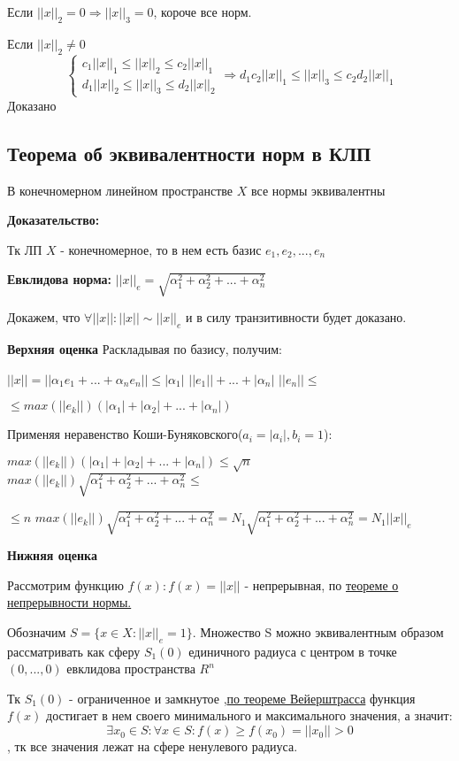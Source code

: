 \documentclass[12pt]{article}
\begin{document}
	Если $||x||_2 = 0 \Rightarrow ||x||_3 = 0$, короче все норм.
	
	Если $||x||_2 \neq 0 $
		$$
\begin{cases}
	c_1||x||_1 \leq ||x||_2 \leq c_2||x||_1 \\
	d_1||x||_2 \leq ||x||_3 \leq d_2||x||_2
\end{cases}
\Rightarrow
	d_1 c_2 ||x||_1 \leq ||x||_3  \leq c_2 d_2||x||_1
$$
		Доказано
		
\subsection{Теорема об эквивалентности норм в КЛП}
	В конечномерном линейном пространстве $X$ все нормы эквивалентны
	
\textbf{Доказательство:}
	
	Тк ЛП $X$ - конечномерное, то в нем есть базис $e_1 , e_2, ..., e_n$
		
	\textbf{Евклидова норма:} $||x||_e = \sqrt{\alpha_1^2 + \alpha_2^2 + ... +\alpha_n^2  }$
	
	Докажем, что $\forall ||x|| : ||x|| \sim ||x||_e$ и в силу транзитивности будет доказано.
	
\textbf{	Верхняя оценка}
	Раскладывая по базису, получим:
	
	$||x|| = || \alpha_1 e_1 + ... + \alpha_n e_n|| \leq |\alpha_1|$ $||e_1|| + ... + |\alpha_n|$ $||e_n|| \leq $
	
	$\leq max(||e_k||) (|\alpha_1| + |\alpha_2| + ...+ |\alpha_n|)$
	
	Применяя неравенство Коши-Буняковского($a_i = |a_i|, b_i = 1$):
			
	$max(||e_k||) (|\alpha_1| + |\alpha_2| + ...+ |\alpha_n|) \leq  \sqrt{n}$ $max(||e_k||)\sqrt{\alpha_1^2 + \alpha_2^2 + ... +\alpha_n^2  } \leq$
	
	$\leq n $ $max(||e_k||)\sqrt{\alpha_1^2 + \alpha_2^2 + ... +\alpha_n^2  } = N_1\sqrt{\alpha_1^2 + \alpha_2^2 + ... +\alpha_n^2  } = N_1 ||x||_e$

\textbf{Нижняя оценка}

		Рассмотрим функцию $f(x): f(x) = ||x||$ - непрерывная, по \hyperref[eq100]{теореме о непрерывности нормы.}
		
		 Обозначим $S = \{ x \in X : ||x||_e = 1 \}$. Множество S можно эквивалентным образом рассматривать как сферу $S_1(0)$ единичного радиуса с центром в
точке $(0,..., 0)$ евклидова пространства $R^n$

	Тк $S_1(0)$ - ограниченное и замкнутое ,\hyperref[eq202]{по теореме Вейерштрасса} функция $f(x)$ достигает в нем
	своего минимального и максимального значения, а значит:
	$$\exists x_0 \in S: \forall x \in S: f(x) \ge f(x_0) = ||x_0|| > 0$$, тк все значения лежат на сфере ненулевого радиуса.
		
\end{document}
